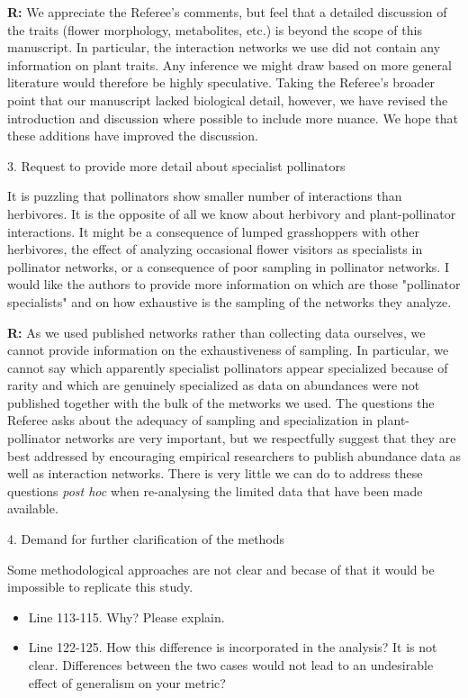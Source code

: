 \documentclass[12pt]{letter}
\newenvironment{refquote}{\bigskip \begin{it}}{\end{it}\smallskip}
\begin{document}
    \textbf{R:} We appreciate the Referee's comments, but feel that a detailed discussion of the traits (flower morphology, metabolites, etc.) is beyond the scope of this manuscript. In particular, the interaction networks we use did not contain any information on plant traits. Any inference we might draw based on more general literature would therefore be highly speculative. Taking the Referee's broader point that our manuscript lacked biological detail, however, we have revised the introduction and discussion where possible to include more nuance. We hope that these additions have improved the discussion.


  3. Request to provide more detail about specialist pollinators

    \begin{refquote}

      It is puzzling that pollinators show smaller number of interactions than herbivores. It is the opposite of all we know about herbivory and plant-pollinator interactions. It might be a consequence of lumped grasshoppers with other herbivores, the effect of analyzing occasional flower visitors as specialists in pollinator networks, or a consequence of poor sampling in pollinator networks. I would like the authors to provide more information on which are those "pollinator specialists" and on how exhaustive is the sampling of the networks they analyze.

    \end{refquote}

    \textbf{R:} As we used published networks rather than collecting data ourselves, we cannot provide information on the exhaustiveness of sampling. In particular, we cannot say which apparently specialist pollinators appear specialized because of rarity and which are genuinely specialized as data on abundances were not published together with the bulk of the metworks we used. The questions the Referee asks about the adequacy of sampling and specialization in plant-pollinator networks are very important, but we respectfully suggest that they are best addressed by encouraging empirical researchers to publish abundance data as well as interaction networks. There is very little we can do to address these questions \emph{post hoc} when re-analysing the limited data that have been made available.


 4. Demand for further clarification of the methods

    \begin{refquote}

      Some methodological approaches are not clear and becase of that it would be impossible to replicate this study.

        \begin{itemize}
          \item Line 113-115. Why? Please explain.
          \item Line 122-125. How this difference is incorporated in the analysis? It is not clear. Differences between the two cases would not lead to an undesirable effect of generalism on your metric?
        \end{itemize}

      \end{refquote}
\end{document}
